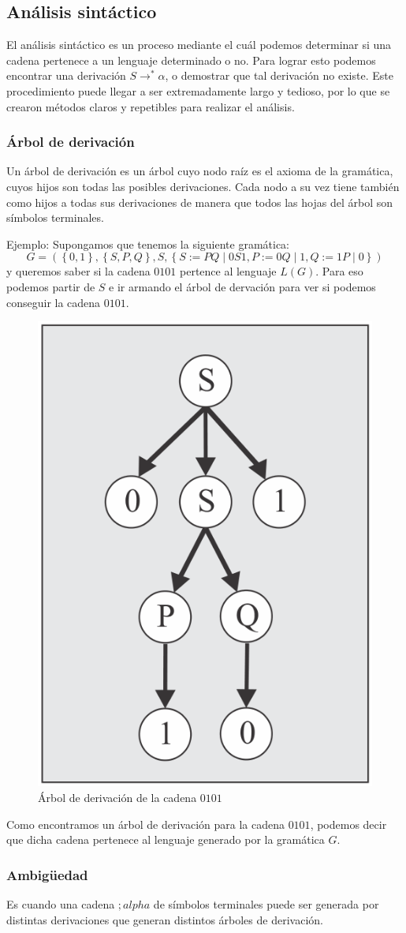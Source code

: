 \documentclass[12pt]{article}
\begin{document}
\subsection{Análisis sintáctico}
El análisis sintáctico es un proceso mediante el cuál podemos determinar si una cadena pertenece a un lenguaje determinado o no. Para lograr esto podemos encontrar una derivación $ S \to^{*} \alpha $, o demostrar que tal derivación no existe. Este procedimiento puede llegar a ser extremadamente largo y tedioso, por lo que se crearon métodos claros y repetibles para realizar el análisis.

\subsubsection{Árbol de derivación}
Un árbol de derivación es un árbol cuyo nodo raíz es el axioma de la gramática, cuyos hijos son todas las posibles derivaciones. Cada nodo a su vez tiene también como hijos a todas sus derivaciones de manera que todos las hojas del árbol son símbolos terminales.

Ejemplo: Supongamos que tenemos la siguiente gramática:
\[
G = \left(\left\{0,1\right\}, \left\{S,P,Q\right\}, S, \left\{S:=PQ \mid 0S1, P:=0Q \mid 1, Q:= 1P \mid 0\right\}\right)
\]
y queremos saber si la cadena $ 0101 $ pertence al lenguaje $ L(G) $. Para eso podemos partir de $ S $ e ir armando el árbol de dervación para ver si podemos conseguir la cadena $ 0101 $.
\begin{figure}[H]
  \centering
  \includegraphics[width=0.3\linewidth]{imagenes/arbol_derivacion.png}
  \caption{Árbol de derivación de la cadena $ 0101 $}
  \label{fig:arbol_derivacion}
\end{figure}

Como encontramos un árbol de derivación para la cadena $ 0101 $, podemos decir que dicha cadena pertenece al lenguaje generado por la gramática $ G $.

\subsubsection{Ambigüedad}
Es cuando una cadena $ ;alpha $ de símbolos terminales puede ser generada por distintas derivaciones que generan distintos árboles de derivación.
\end{document}
